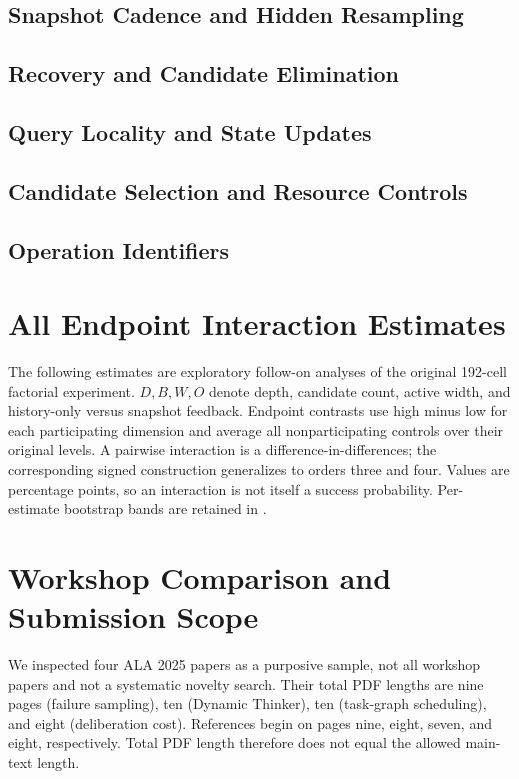 \subsection{Snapshot Cadence and Hidden Resampling}

\subsection{Recovery and Candidate Elimination}

\subsection{Query Locality and State Updates}

\subsection{Candidate Selection and Resource Controls}

\subsection{Operation Identifiers}

\normalsize

\section{All Endpoint Interaction Estimates}
\label{app:interactions}
The following estimates are exploratory follow-on analyses of the original
192-cell factorial experiment. $D,B,W,O$ denote depth, candidate count,
active width, and history-only versus snapshot feedback. Endpoint
contrasts use high minus low for each participating dimension and average
all nonparticipating controls over their original levels. A pairwise
interaction is a difference-in-differences; the corresponding signed
construction generalizes to orders three and four. Values are percentage
points, so an interaction is not itself a success probability. Per-estimate
bootstrap bands are retained in
.

\begin{center}
\small
\resizebox{\textwidth}{!}{}

\medskip
\resizebox{\textwidth}{!}{}
\end{center}

\section{Workshop Comparison and Submission Scope}
We inspected four ALA 2025 papers as a purposive sample, not all workshop
papers and not a systematic novelty search. Their total PDF lengths are
nine pages (failure sampling), ten (Dynamic Thinker), ten (task-graph
scheduling), and eight (deliberation cost). References begin on pages
nine, eight, seven, and eight, respectively. Total PDF length therefore
does not equal the allowed main-text length.

